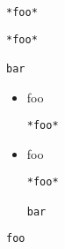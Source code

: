 \begin{verbatim}
*foo*
\end{verbatim}

\begin{verbatim}
*foo*

bar
\end{verbatim}

\begin{itemize}
\item foo

\begin{verbatim}
*foo*
\end{verbatim}

\item foo

\begin{verbatim}
*foo*

bar
\end{verbatim}

\end{itemize}

\begin{verbatim}
foo
\end{verbatim}
